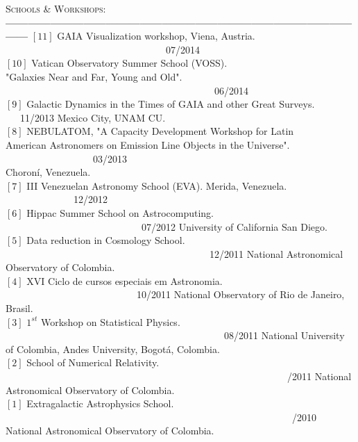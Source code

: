 \documentclass[letterpaper]{article}
\begin{document}
\textsc{\Large Schools \& Workshops:}\\
{\bf---------------------------------------------------------------------------------------------------}
$\left[11\right]$ GAIA Visualization workshop, Viena, Austria. \indent \ \ \  \ \ \ \ \ \ \ \ \ \ \ \ \ \ \ \ \ \ \ \ \ \ \ \ \ \ \ \ \ \ 07/2014\\
$\left[10\right]$ Vatican Observatory Summer School (VOSS).\\
"Galaxies Near and Far, Young and Old". \indent \ \ \ \  \ \ \  \ \ \  \ \ \  \ \  
 \ \ \ \ \ \ \ \ \ \ \ \ \ \ \ \ \ \ \ \ \ \ \ \ \ \ \ \ 06/2014 \\
$\left[9\right]$ Galactic Dynamics in the Times of GAIA and other Great Surveys. \indent \ \ \ 11/2013
Mexico City, UNAM CU.\\
$\left[8\right]$ \textsc{NEBULATOM}, "A Capacity Development Workshop for Latin\\ 
American Astronomers on Emission Line Objects in the Universe". \indent \ \ \ \ \ \ \ \ \ \ \ \ \ \ \ \ \ \ 03/2013 \\
Choron\'i, Venezuela.  \\
$\left[7\right]$ III Venezuelan Astronomy School (EVA). Merida, Venezuela. \indent \ \ \ \ \ \ \ \ \ \ \ \ \ \ 12/2012\\
$\left[6\right]$ Hippac Summer School on Astrocomputing. \indent \ \ \ \ \ \ \ \ \ \ \ \ \ \ \ \ \ \ \ \ \ \ \ \ \ \ \ \ 07/2012 
University of California San Diego. \\
$\left[5\right]$ Data reduction in Cosmology School.  \indent \ \ \ \ \ \ \ \ \ \ \ \ \ \ \ \ \ \ \ \ \ \ \ \ \ \ \ \ \ \ \ \ \ \ \ \ \ \ \ \ \ \ 12/2011 
National Astronomical Observatory of Colombia.\\
$\left[4\right]$ XVI Ciclo de cursos especiais em Astronomia.  \indent \ \ \ \ \ \ \ \ \ \ \ \ \ \ \ \ \ \ \ \ \ \ \ \ \ \ \ 10/2011
National Observatory of Rio de Janeiro, Brasil. \\
$\left[3\right]$ $1^{st}$ Workshop on Statistical Physics. \indent \ \ \ \ \ \ \ \ \ \ \ \ \ \ \ \ \ \ \ \ \ \ \ \ \ \ \ \ \ \ \ \ \ \ \ \ \ \ \ \ \ \ \ \ \ 08/2011
National University of Colombia, Andes University, Bogot\'{a}, Colombia. \\
$\left[2\right]$ School of Numerical Relativity. \indent \ \ \ \ \ \ \ \ \ \ \ \ \ \ \ \ \ \ \ \ \ \ \ \ \ \ \ \ \ \ \ \ \ \ \ \ \ \ \ \ \ \ \ \ \ \ \ \ \ \ \ \ \ \ \ \ \ \ /2011
National Astronomical Observatory of Colombia.\\
$\left[1\right]$ Extragalactic Astrophysics School. \indent \ \ \ \ \ \ \ \ \ \ \ \ \ \ \ \ \ \ \ \ \ \ \ \ \ \ \ \ \ \ \ \ \ \ \ \ \ \ \ \ \ \ \ \ \ \ \ \ \ \ \ \ \ \ \ \ \ \ \ /2010
National Astronomical Observatory of Colombia.\\
\end{document}
